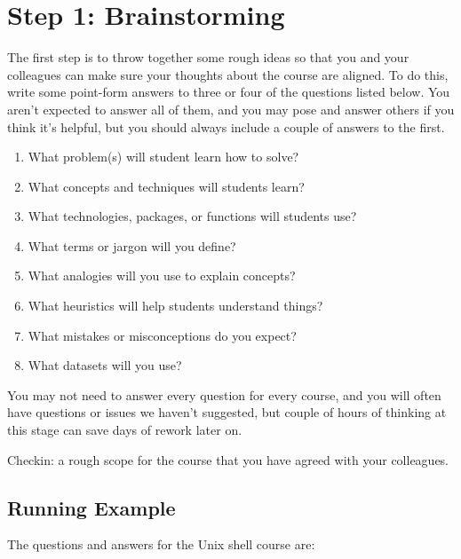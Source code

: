 \documentclass[10pt,statementpaper]{memoir}
\providecommand{\tightlist}{%
  \setlength{\itemsep}{0pt}\setlength{\parskip}{0pt}}
\begin{document}
\section{Step 1: Brainstorming}\label{step-1-brainstorming}

The first step is to throw together some rough ideas so that you and
your colleagues can make sure your thoughts about the course are
aligned. To do this, write some point-form answers to three or four of
the questions listed below. You aren't expected to answer all of them,
and you may pose and answer others if you think it's helpful, but you
should always include a couple of answers to the first.

\begin{enumerate}
\def\labelenumi{\arabic{enumi}.}
\tightlist
\item
  What problem(s) will student learn how to solve?
\item
  What concepts and techniques will students learn?
\item
  What technologies, packages, or functions will students use?
\item
  What terms or jargon will you define?
\item
  What analogies will you use to explain concepts?
\item
  What heuristics will help students understand things?
\item
  What mistakes or misconceptions do you expect?
\item
  What datasets will you use?
\end{enumerate}

You may not need to answer every question for every course, and you will
often have questions or issues we haven't suggested, but couple of hours
of thinking at this stage can save days of rework later on.

Checkin: a rough scope for the course that you have agreed with your
colleagues.

\subsection{Running Example}\label{running-example}

The questions and answers for the Unix shell course are:
\end{document}
